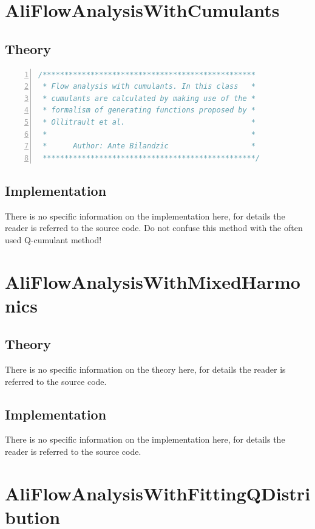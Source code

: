 \documentclass[a4paper]{book}
\numberwithin{equation}{subsection}
\begin{document}
\section{AliFlowAnalysisWithCumulants}
\subsection{Theory}
\begin{lstlisting}[language=C, numbers=left]
/************************************************* 
 * Flow analysis with cumulants. In this class   *
 * cumulants are calculated by making use of the *
 * formalism of generating functions proposed by *
 * Ollitrault et al.                             *
 *                                               * 
 *      Author: Ante Bilandzic                   * 
 *************************************************/ \end{lstlisting}

\subsection{Implementation}
There is no specific information on the implementation here, for details the reader is referred to the source code. Do not confuse this method with the often used Q-cumulant method!
\section{AliFlowAnalysisWithMixedHarmonics}
\subsection{Theory}
There is no specific information on the theory here, for details the reader is referred to the source code.
\subsection{Implementation}
There is no specific information on the implementation here, for details the reader is referred to the source code.

\section{AliFlowAnalysisWithFittingQDistribution}
\end{document}
